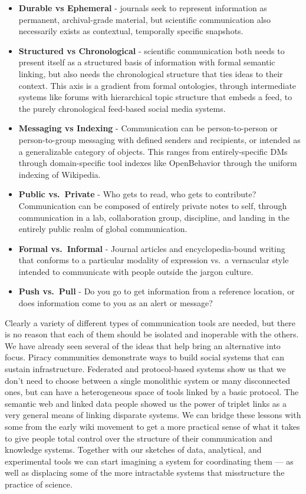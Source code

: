 \documentclass[10pt]{tufte-book}
\begin{document}
\begin{itemize}

\item
  \textbf{Durable vs Ephemeral} - journals seek to represent information
  as permanent, archival-grade material, but scientific communication
  also necessarily exists as contextual, temporally specific snapshots.
\item
  \textbf{Structured vs Chronological} - scientific communication both
  needs to present itself as a structured basis of information with
  formal semantic linking, but also needs the chronological structure
  that ties ideas to their context. This axis is a gradient from formal
  ontologies, through intermediate systems like forums with hierarchical
  topic structure that embeds a feed, to the purely chronological
  feed-based social media systems.
\item
  \textbf{Messaging vs Indexing} - Communication can be person-to-person
  or person-to-group messaging with defined senders and recipients, or
  intended as a generalizable category of objects. This ranges from
  entirely-specific DMs through domain-specific tool indexes like
  OpenBehavior through the uniform indexing of Wikipedia.
\item
  \textbf{Public vs.~Private} - Who gets to read, who gets to
  contribute? Communication can be composed of entirely private notes to
  self, through communication in a lab, collaboration group, discipline,
  and landing in the entirely public realm of global communication.
\item
  \textbf{Formal vs.~Informal} - Journal articles and encyclopedia-bound
  writing that conforms to a particular modality of expression vs.~a
  vernacular style intended to communicate with people outside the
  jargon culture.
\item
  \textbf{Push vs.~Pull} - Do you go to get information from a reference
  location, or does information come to you as an alert or message?
\end{itemize}

Clearly a variety of different types of communication tools are needed,
but there is no reason that each of them should be isolated and
inoperable with the others. We have already seen several of the ideas
that help bring an alternative into focus. Piracy communities
demonstrate ways to build social systems that can sustain
infrastructure. Federated and protocol-based systems show us that we
don't need to choose between a single monolithic system or many
disconnected ones, but can have a heterogeneous space of tools linked by
a basic protocol. The semantic web and linked data people showed us the
power of triplet links as a very general means of linking disparate
systems. We can bridge these lessons with some from the early wiki
movement to get a more practical sense of what it takes to give people
total control over the structure of their communication and knowledge
systems. Together with our sketches of data, analytical, and
experimental tools we can start imagining a system for coordinating them
--- as well as displacing some of the more intractable systems that
misstructure the practice of science.
\end{document}
